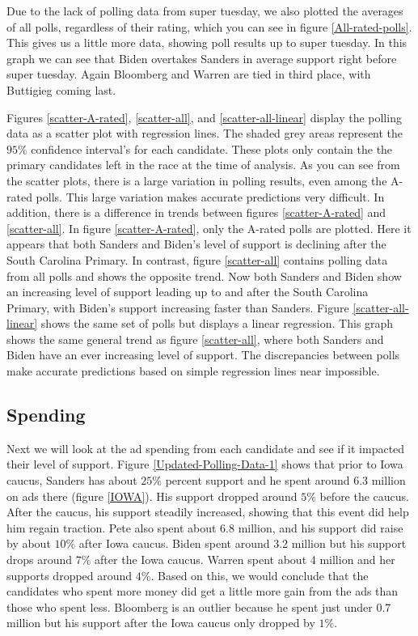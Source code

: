 Due to the lack of polling data from super tuesday, we also plotted the averages of all polls, regardless of their rating, which you can see in figure \ref{All-rated-polls}. This gives us a little more data, showing poll results up to super tuesday. In this graph we can see that Biden overtakes Sanders in average support right before super tuesday. Again Bloomberg and Warren are tied in third place, with Buttigieg coming last.

Figures \ref{scatter-A-rated}, \ref{scatter-all}, and \ref{scatter-all-linear} display the polling data as a scatter plot with regression lines. The shaded grey areas represent the $95\%$ confidence interval's for each candidate. These plots only contain the the primary candidates left in the race at the time of analysis. As you can see from the scatter plots, there is a large variation in polling results, even among the A-rated polls. This large variation makes accurate predictions very difficult. In addition, there is a difference in trends between figures \ref{scatter-A-rated} and \ref{scatter-all}. In figure \ref{scatter-A-rated}, only the A-rated polls are plotted. Here it appears that both Sanders and Biden's level of support is declining after the South Carolina Primary. In contrast, figure \ref{scatter-all} contains polling data from all polls and shows the opposite trend. Now both Sanders and Biden show an increasing level of support leading up to and after the South Carolina Primary, with Biden's support increasing faster than Sanders. Figure \ref{scatter-all-linear} shows the same set of polls but displays a linear regression. This graph shows the same general trend as figure \ref{scatter-all}, where both Sanders and Biden have an ever increasing level of support. The discrepancies between polls make accurate predictions based on simple regression lines near impossible.

\subsection{Spending}

Next we will look at the ad spending from each candidate and see if it impacted their level of support. Figure \ref{Updated-Polling-Data-1} shows that prior to Iowa caucus, Sanders has about $25\%$ percent support and he spent around 6.3 million on ads there (figure \ref{IOWA}). His support dropped around $5\%$ before the caucus. After the caucus, his support steadily increased, showing that this event did help him regain traction. Pete also spent about 6.8 million, and his support did raise by about $10\%$ after Iowa caucus. Biden spent around 3.2 million but his support drops around $7\%$ after the Iowa caucus. Warren spent about 4 million and her supports dropped around $4\%$. Based on this, we would conclude that the candidates who spent more money did get a little more gain from the ads than those who spent less. Bloomberg is an outlier because he spent just under 0.7 million but his support after the Iowa caucus only dropped by $1\%$.

